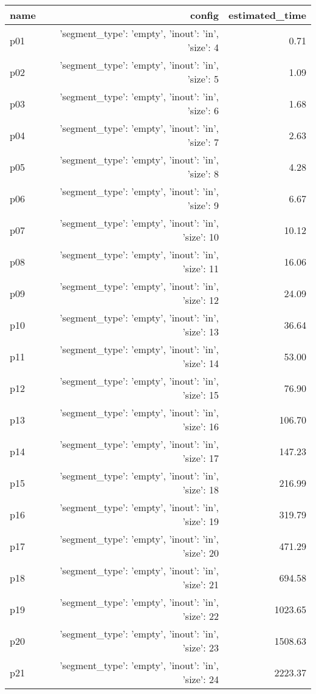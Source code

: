 \documentclass{article}
\begin{document}
                            \begin{center}
                            \scriptsize
                            \begin{tabular}{@{}l|r|r@{}}
                            name & config & estimated\_time\\\midrule
                              p01&{'segment\_type': 'empty', 'inout': 'in', 'size': 4}&0.71\\
  p02&{'segment\_type': 'empty', 'inout': 'in', 'size': 5}&1.09\\
  p03&{'segment\_type': 'empty', 'inout': 'in', 'size': 6}&1.68\\
  p04&{'segment\_type': 'empty', 'inout': 'in', 'size': 7}&2.63\\
  p05&{'segment\_type': 'empty', 'inout': 'in', 'size': 8}&4.28\\
  p06&{'segment\_type': 'empty', 'inout': 'in', 'size': 9}&6.67\\
  p07&{'segment\_type': 'empty', 'inout': 'in', 'size': 10}&10.12\\
  p08&{'segment\_type': 'empty', 'inout': 'in', 'size': 11}&16.06\\
  p09&{'segment\_type': 'empty', 'inout': 'in', 'size': 12}&24.09\\
  p10&{'segment\_type': 'empty', 'inout': 'in', 'size': 13}&36.64\\
  p11&{'segment\_type': 'empty', 'inout': 'in', 'size': 14}&53.00\\
  p12&{'segment\_type': 'empty', 'inout': 'in', 'size': 15}&76.90\\
  p13&{'segment\_type': 'empty', 'inout': 'in', 'size': 16}&106.70\\
  p14&{'segment\_type': 'empty', 'inout': 'in', 'size': 17}&147.23\\
  p15&{'segment\_type': 'empty', 'inout': 'in', 'size': 18}&216.99\\
  p16&{'segment\_type': 'empty', 'inout': 'in', 'size': 19}&319.79\\
  p17&{'segment\_type': 'empty', 'inout': 'in', 'size': 20}&471.29\\
  p18&{'segment\_type': 'empty', 'inout': 'in', 'size': 21}&694.58\\
  p19&{'segment\_type': 'empty', 'inout': 'in', 'size': 22}&1023.65\\
  p20&{'segment\_type': 'empty', 'inout': 'in', 'size': 23}&1508.63\\
  p21&{'segment\_type': 'empty', 'inout': 'in', 'size': 24}&2223.37\\

\end{tabular}
\end{center}
\end{document}
